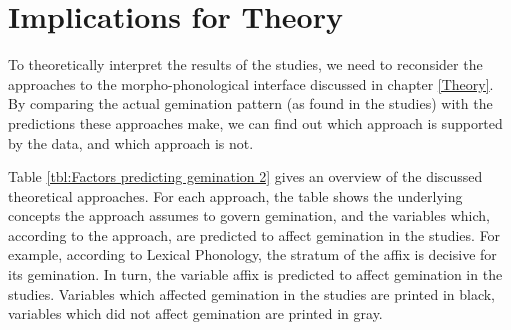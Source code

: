 \section{Implications for Theory}


To theoretically interpret the results of the studies, we need to reconsider the approaches to the morpho-phonological interface discussed in chapter \ref{Theory}.   By comparing the actual gemination pattern (as found in the studies) with the predictions these approaches make, we can find out which approach is supported by the data, and which approach is not.



Table \ref{tbl:Factors predicting gemination 2} gives an overview of the discussed theoretical approaches. For each approach, the table shows the underlying concepts the approach assumes to govern gemination, and the variables which, according to the approach, are predicted to affect gemination in the studies. For example, according to Lexical Phonology, the stratum of the affix is decisive for its gemination. In turn, the variable affix is predicted to affect gemination in the studies. 
Variables which affected gemination in the studies are printed in black, variables which did not affect gemination are printed in gray.






